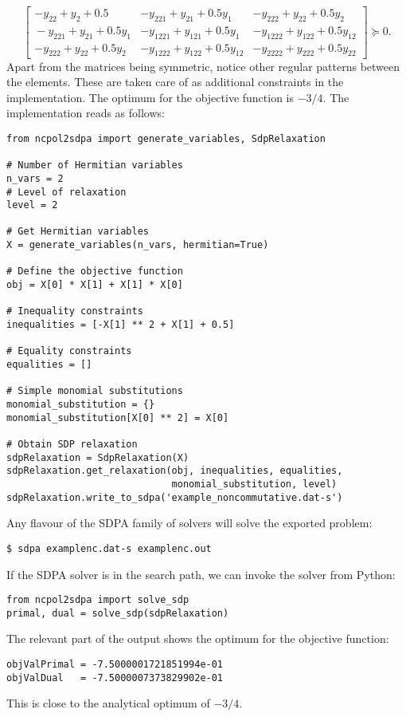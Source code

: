 \documentclass{article}
\begin{document}
\[
\left[ \begin{array}{c|cc}
-y_{22}+y_{2}+0.5 & -y_{221}+y_{21}+0.5y_{1} & -y_{222}+y_{22}+0.5y_{2}\\
\hline{}
-y_{221}+y_{21}+0.5y_{1} & -y_{1221}+y_{121}+0.5y_{1} & -y_{1222}+y_{122}+0.5y_{12}\\
-y_{222}+y_{22}+0.5y_{2} & -y_{1222}+y_{122}+0.5y_{12} & -y_{2222}+y_{222}+0.5y_{22}
\end{array}\right]\succeq{}0.
\]
Apart from the matrices being symmetric, notice other regular patterns between the elements. These are taken care of as additional constraints in the implementation. The optimum for the objective function is $-3/4$. The implementation reads as follows:
\begin{verbatim}
from ncpol2sdpa import generate_variables, SdpRelaxation

# Number of Hermitian variables
n_vars = 2
# Level of relaxation
level = 2

# Get Hermitian variables
X = generate_variables(n_vars, hermitian=True)

# Define the objective function
obj = X[0] * X[1] + X[1] * X[0]

# Inequality constraints
inequalities = [-X[1] ** 2 + X[1] + 0.5]

# Equality constraints
equalities = []

# Simple monomial substitutions
monomial_substitution = {}
monomial_substitution[X[0] ** 2] = X[0]

# Obtain SDP relaxation
sdpRelaxation = SdpRelaxation(X)
sdpRelaxation.get_relaxation(obj, inequalities, equalities,
                             monomial_substitution, level)
sdpRelaxation.write_to_sdpa('example_noncommutative.dat-s')
\end{verbatim}

Any flavour of the SDPA family of solvers will solve the exported problem:
\begin{verbatim}
$ sdpa examplenc.dat-s examplenc.out
\end{verbatim}

If the SDPA solver is in the search path, we can invoke the solver from Python:
\begin{verbatim}
from ncpol2sdpa import solve_sdp
primal, dual = solve_sdp(sdpRelaxation)
\end{verbatim}

The relevant part of the output shows the optimum for the objective function:
\begin{verbatim}
objValPrimal = -7.5000001721851994e-01
objValDual   = -7.5000007373829902e-01
\end{verbatim}
This is close to the analytical optimum of $-3/4$.
\end{document}
